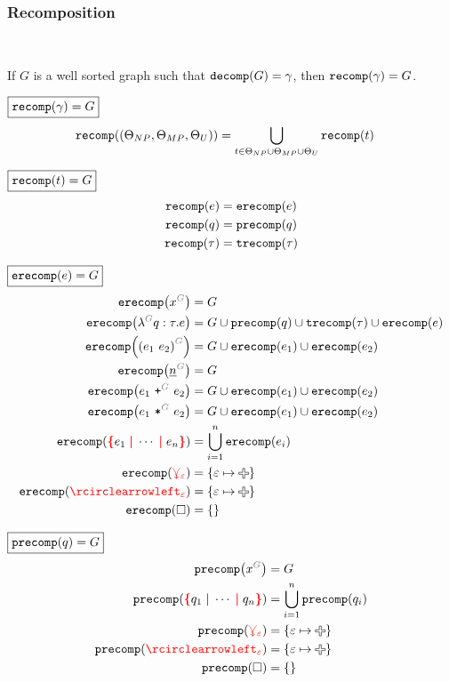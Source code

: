 
\subsubsection{Recomposition}\hspace*{\fill} \\

\begin{theorem}
  If $G$ is a well sorted graph such that $\decomp{G} = \Grove$,
  then $\recomp{\Grove} = G$.
\end{theorem}

\noindent $\boxed{\recomp{\Grove} = G}$
%
\begin{align*}
  \recomp{(\Set[NP], \Set[MP], \Set[U])} &= \bigcup_{t \in \Set[NP] \cup \Set[MP] \cup \Set[U]} \recomp{t}
\end{align*}

\noindent $\boxed{\recomp{t} = G}$
%
\begin{align*}
  \recomp{e} &= \erecomp{e} \\
  \recomp{q} &= \precomp{q} \\
  \recomp{\tau} &= \trecomp{\tau}
\end{align*}

\noindent $\boxed{\erecomp{e} = G}$
%
\begin{align*}
  \erecomp{\eVar{G}{x}} &= G
  \\
  \erecomp{\eFun{G}{q}{\tau}{e}}
    &= G \cup \precomp{q} \cup \trecomp{\tau} \cup \erecomp{e}
  \\
  \erecomp{\eApp{G}{e_1}{e_2}}
    &= G \cup \erecomp{e_1} \cup \erecomp{e_2}
  \\
  \erecomp{\eNum{G}{n}} &= G
  \\
  \erecomp{\ePlus{G}{e_1}{e_2}}
    &= G \cup \erecomp{e_1} \cup \erecomp{e_2}
  \\
  \erecomp{\eTimes{G}{e_1}{e_2}}
    &= G \cup \erecomp{e_1} \cup \erecomp{e_2}
  \\
  \erecomp{\conflictHole{e_1, \cdots, e_n}}
  &= \bigcup_{i=1}^n \erecomp{e_i}
  \\
  \erecomp{\multiVertex{\e}} &= \SetOf{\e \mapsto \Plus}
  \\
  \erecomp{\cycleVertex{\e}} &= \SetOf{\e \mapsto \Plus}
  \\
  \erecomp{\hole} &= \SetOf{}
\end{align*}

\noindent $\boxed{\precomp{q} = G}$
%
\begin{align*}
  \precomp{\pVar{G}{x}} &= G
  \\
  \precomp{\conflictHole{q_1, \cdots, q_n}} &= \bigcup_{i=1}^n \precomp{q_i}
  \\
  \precomp{\multiVertex{\e}} &= \SetOf{\e \mapsto \Plus}
  \\
  \precomp{\cycleVertex{\e}} &= \SetOf{\e \mapsto \Plus}
  \\
  \precomp{\hole} &= \SetOf{}
\end{align*}


